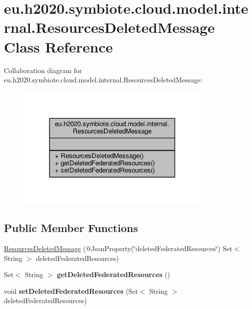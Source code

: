 \hypertarget{classeu_1_1h2020_1_1symbiote_1_1cloud_1_1model_1_1internal_1_1ResourcesDeletedMessage}{}\section{eu.\+h2020.\+symbiote.\+cloud.\+model.\+internal.\+Resources\+Deleted\+Message Class Reference}
\label{classeu_1_1h2020_1_1symbiote_1_1cloud_1_1model_1_1internal_1_1ResourcesDeletedMessage}


Collaboration diagram for eu.\+h2020.\+symbiote.\+cloud.\+model.\+internal.\+Resources\+Deleted\+Message\+:\nopagebreak
\begin{figure}[H]
\begin{center}
\leavevmode
\includegraphics[width=272pt]{classeu_1_1h2020_1_1symbiote_1_1cloud_1_1model_1_1internal_1_1ResourcesDeletedMessage__coll__graph}
\end{center}
\end{figure}
\subsection*{Public Member Functions}
\begin{DoxyCompactItemize}
\item 
\hyperlink{classeu_1_1h2020_1_1symbiote_1_1cloud_1_1model_1_1internal_1_1ResourcesDeletedMessage_af4925b3c3a25515739730f07478a04b3}{Resources\+Deleted\+Message} (@Json\+Property(\char`\"{}deleted\+Federated\+Resources\char`\"{}) Set$<$ String $>$ deleted\+Federated\+Resources)
\item 
\mbox{\label{classeu_1_1h2020_1_1symbiote_1_1cloud_1_1model_1_1internal_1_1ResourcesDeletedMessage_a2121e99ecd401563595b6ee6d4608caa}} 
Set$<$ String $>$ {\bfseries get\+Deleted\+Federated\+Resources} ()
\item 
\mbox{\label{classeu_1_1h2020_1_1symbiote_1_1cloud_1_1model_1_1internal_1_1ResourcesDeletedMessage_a781ba352f2361e786b47151156905709}} 
void {\bfseries set\+Deleted\+Federated\+Resources} (Set$<$ String $>$ deleted\+Federated\+Resources)
\end{DoxyCompactItemize}


